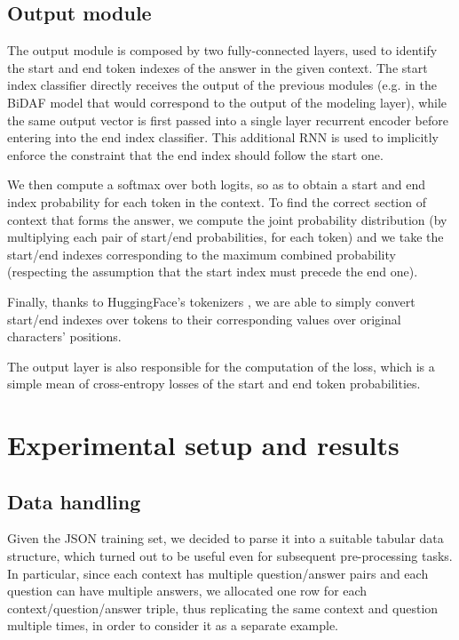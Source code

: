 \documentclass[a4paper,10pt]{report}
\begin{document}
\section{Output module}\label{sec:output-module}
The output module is composed by two fully-connected layers, used to identify the start and end token indexes of the answer in the given context. The start index classifier directly receives the output of the previous modules (e.g. in the BiDAF model that would correspond to the output of the modeling layer), while the same output vector is first passed into a single layer recurrent encoder before entering into the end index classifier. This additional RNN is used to implicitly enforce the constraint that the end index should follow the start one.

We then compute a softmax over both logits, so as to obtain a start and end index probability for each token in the context. To find the correct section of context that forms the answer, we compute the joint probability distribution (by multiplying each pair of start/end probabilities, for each token) and we take the start/end indexes corresponding to the maximum combined probability (respecting the assumption that the start index must precede the end one).

Finally, thanks to HuggingFace's tokenizers \cite{tokenizers}, we are able to simply convert start/end indexes over tokens to their corresponding values over original characters' positions.

The output layer is also responsible for the computation of the loss, which is a simple mean of cross-entropy losses of the start and end token probabilities.

\chapter{Experimental setup and results}\label{chap:experiments}

\section{Data handling}\label{sec:data-handling}
Given the JSON training set, we decided to parse it into a suitable tabular data structure, which turned out to be useful even for subsequent pre-processing tasks. In particular, since each context has multiple question/answer pairs and each question can have multiple answers, we allocated one row for each context/question/answer triple, thus replicating the same context and question multiple times, in order to consider it as a separate example.
\end{document}
